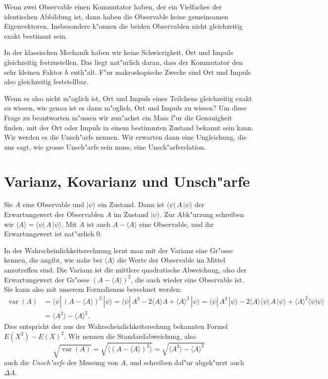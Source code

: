 \begin{satz}
Wenn zwei Observable einen Kommutator haben, der ein Vielfaches
der identischen Abbildung ist, dann haben die Observable keine
gemeinsamen Eigenvektoren.
Insbesondere k"onnen die beiden Observablen nicht gleichzeitig 
exakt bestimmt sein.
\end{satz}

In der klassischen Mechanik haben wir keine Schwierigkeit, Ort und
Impuls gleichzeitig festzustellen. Das liegt nat"urlich daran, dass
der Kommutator den sehr kleinen Faktor $\hbar$ enth"alt.
F"ur makroskopische Zwecke sind Ort und Impuls also gleichzeitig 
feststellbar.

Wenn es also nicht m"oglich ist, Ort und Impuls eines Teilchens
gleichzeitig exakt zu wissen, wie genau ist es dann m"oglich,
Ort und Impuls zu wissen?
Um diese Frage zu beantworten m"ussen wir zun"achst ein Mass f"ur
die Genauigkeit finden, mit der Ort oder Impuls in einem bestimmten
Zustand bekannt sein kann.
Wir werden es die Unsch"arfe nennen.
Wir erwarten dann eine Ungleichung, die uns sagt, wie grosse 
Unsch"arfe sein muss, eine Unsch"arferelation.


\section{Varianz, Kovarianz und Unsch"arfe}
Sie $A$ eine Observable und $|\psi\rangle$ ein Zustand. Dann ist
$\langle \psi|\,A\,|\psi\rangle$ der Erwartungswert der Observablen $A$ 
im Zustand $|\psi\rangle$.
Zur Abk"urzung schreiben wir $\langle A\rangle=\langle\psi|\,A\,|\psi\rangle$.
Mit $A$ ist auch $A-\langle A\rangle$ eine Observable, und ihr Erwartungswert
ist nat"urlich $0$.

In der Wahrscheinlichkeitsrechnung lernt man mit der Varianz eine
Gr"osse kennen, die angibt, wie nahe bei $\langle A\rangle$ die
Werte der Observable im Mittel anzutreffen sind.
Die Varianz ist die mittlere quadratische Abweichung, also der
Erwartungswert der Gr"osse $(A-\langle A\rangle)^2$, die auch wieder
eine Observable ist. Sie kann also mit unserem Formalismus berechnet
werden:
\begin{align*}
\operatorname{var}(A)
&=
\langle \psi|\, (A-\langle A\rangle)^2\,|\psi\rangle
=
\langle\psi|\, A^2-2\langle A\rangle A+\langle A\rangle^2\,|\psi\rangle
=
\langle\psi|\,A^2\,|\psi\rangle 
-2\langle A\rangle \langle\psi|\,A\,|\psi\rangle
+\langle A\rangle^2\langle\psi|\psi\rangle
\\
&=\langle A^2\rangle -\langle A\rangle^2.
\end{align*}
Dies entspricht der aus der Wahrscheinlichkeitsrechung bekannten Formel
$E(X^2)-E(X)^2$.
Wir nennen die Standardabweichung, also
\[
\sqrt{\operatorname{var}(A)}
=
\sqrt{\langle (A-\langle A\rangle)^2\rangle}
=
\sqrt{\langle A^2\rangle - \langle A\rangle^2}
\]
auch die {\em Unsch"arfe} der Messung von $A$, und schreiben daf"ur abgek"urzt
auch $\Delta A$.

